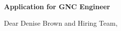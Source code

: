 \documentclass[10pt,a4paper]{article}
\newcommand{\SubjectSize}{10pt}
\newcommand{\BodySize}{9.25pt}
\newcommand{\SubjectLineSize}{11.5pt}
\newcommand{\BodyLineSize}{12.1pt}
\newcommand{\RecipientAfter}{8pt}         %
\newcommand{\SubjectAfter}{42pt}          %
\newcommand{\SalutationAfter}{18pt}       %
\begin{document}
\vspace{\RecipientAfter}

{\fontsize{\SubjectSize}{\SubjectLineSize}\selectfont
    \textbf{\textcolor{CVBlack}{Application for GNC Engineer}}}

\vspace{\SubjectAfter}

{\fontsize{\BodySize}{\BodyLineSize}\selectfont
    \textcolor{CVDarkGray}{Dear Denise Brown and Hiring Team,}}


\vspace{\SalutationAfter}

\end{document}

